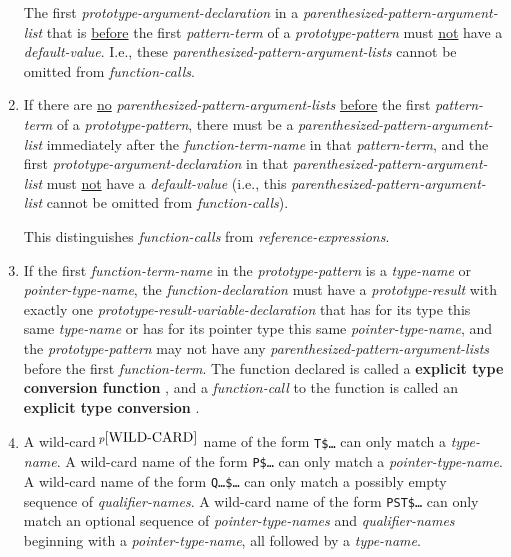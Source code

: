 \documentclass[12pt]{article}
\newcommand{\key}[1]{{\rm \bfseries #1}}
\newcommand{\pagnote}[1]{$\,^{p\pageref{#1}}$}
\begin{document}
\begin{enumerate}
The first {\em prototype-argument-declaration}
in a {\em parenthesized-pattern-argument-list} that is
\underline{before} the first {\em pattern-term} of a
{\em prototype-pattern} must \underline{not} have a {\em default-value}.
I.e., these {\em parenthesized-pattern-argument-lists} cannot be omitted from
{\em function-calls}.
\item
If there are \underline{no} {\em parenthesized-pattern-argument-lists}
\underline{before} the first {\em pattern-term} of a
{\em prototype-pattern}, there must be a
{\em parenthesized-pattern-argument-list}
immediately after the {\em function-term-name} in that {\em pattern-term},
and the first {\em prototype-argument-declaration} in that
{\em parenthesized-pattern-argument-list}
must \underline{not} have a {\em default-value}
(i.e., this {\em parenthesized-pattern-argument-list} cannot be omitted from
{\em function-calls}).

This distinguishes {\em function-calls} from {\em reference-expressions}.
\item
If the first {\em function-term-name} in the {\em prototype-pattern}
is a {\em type-name} or {\em pointer-type-name},
the {\em function-declaration} must have
a {\em prototype-result} with exactly
one {\em prototype-result-variable-declaration}
that has for its type this same {\em type-name} or has for its pointer type
this same {\em pointer-type-name},
and the {\em prototype-pattern} may not have any
{\em parenthesized-pattern-argument-lists} before the first
{\em function-term}.  The function
declared is called a \key{explicit type conversion function}%
\label{EXPLICIT-TYPE-CONVERSION-FUNCTION}, and a {\em function-call}
to the function is called an \key{explicit type conversion}%
\label{EXPLICIT-TYPE-CONVERSION}.
\item\label{PROTOTYPE-WILD-CARDS}
A wild-card\pagnote{WILD-CARD} name of the form {\tt T\$\ldots}
can only match a {\em type-name}.
A wild-card name of the form {\tt P\$\ldots} can only match a
{\em pointer-type-name}.
A wild-card name of the form {\tt Q\ldots\$\ldots} can only match a
possibly empty sequence of {\em qualifier-names}.
A wild-card name of the form {\tt PST\$\ldots} can only match an
optional sequence of {\em pointer-type-names} and {\em qualifier-names}
beginning with a {\em pointer-type-name}, all followed by a {\em type-name}.


\end{enumerate}
\end{document}
